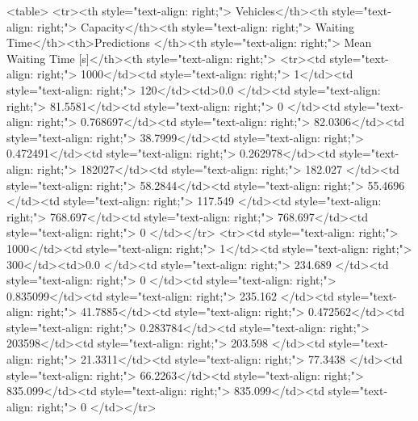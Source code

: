 <table>
<tr><th style="text-align: right;">  Vehicles</th><th style="text-align: right;">  Capacity</th><th style="text-align: right;">  Waiting Time</th><th>Predictions  </th><th style="text-align: right;">  Mean Waiting Time [s]</th><th style="text-align: right;">  %
<tr><td style="text-align: right;">      1000</td><td style="text-align: right;">         1</td><td style="text-align: right;">           120</td><td>0.0          </td><td style="text-align: right;">                81.5581</td><td style="text-align: right;">             0     </td><td style="text-align: right;">         0.768697</td><td style="text-align: right;">         82.0306</td><td style="text-align: right;">            38.7999</td><td style="text-align: right;">               0.472491</td><td style="text-align: right;">             0.262978</td><td style="text-align: right;">              182027</td><td style="text-align: right;">                      182.027 </td><td style="text-align: right;">            58.2844</td><td style="text-align: right;">                55.4696 </td><td style="text-align: right;">       117.549 </td><td style="text-align: right;">    768.697</td><td style="text-align: right;">       768.697</td><td style="text-align: right;">                  0     </td></tr>
<tr><td style="text-align: right;">      1000</td><td style="text-align: right;">         1</td><td style="text-align: right;">           300</td><td>0.0          </td><td style="text-align: right;">               234.689 </td><td style="text-align: right;">             0     </td><td style="text-align: right;">         0.835099</td><td style="text-align: right;">        235.162 </td><td style="text-align: right;">            41.7885</td><td style="text-align: right;">               0.472562</td><td style="text-align: right;">             0.283784</td><td style="text-align: right;">              203598</td><td style="text-align: right;">                      203.598 </td><td style="text-align: right;">            21.3311</td><td style="text-align: right;">                77.3438 </td><td style="text-align: right;">        66.2263</td><td style="text-align: right;">    835.099</td><td style="text-align: right;">       835.099</td><td style="text-align: right;">                  0     </td></tr>
